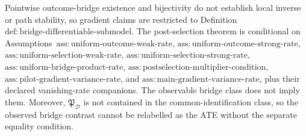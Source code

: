 Pointwise outcome-bridge existence and bijectivity do not establish local inverse or path stability, so gradient claims are restricted to Definition~\(\mathrm{def{:}bridge\text{-}differentiable\text{-}submodel}\).  The post-selection theorem is conditional on Assumptions~\(\mathrm{ass{:}uniform\text{-}outcome\text{-}weak\text{-}rate}\), \(\mathrm{ass{:}uniform\text{-}outcome\text{-}strong\text{-}rate}\), \(\mathrm{ass{:}uniform\text{-}selection\text{-}weak\text{-}rate}\), \(\mathrm{ass{:}uniform\text{-}selection\text{-}strong\text{-}rate}\), \(\mathrm{ass{:}uniform\text{-}bridge\text{-}product\text{-}rate}\), \(\mathrm{ass{:}postselection\text{-}multiplier\text{-}condition}\), \(\mathrm{ass{:}pilot\text{-}gradient\text{-}variance\text{-}rate}\), and \(\mathrm{ass{:}main\text{-}gradient\text{-}variance\text{-}rate}\), plus their declared vanishing-rate companions.  The observable bridge class does not imply them.  Moreover, \(\mathfrak P_{\mathcal D}\) is not contained in the common-identification class, so the observed bridge contrast cannot be relabelled as the ATE without the separate equality condition.